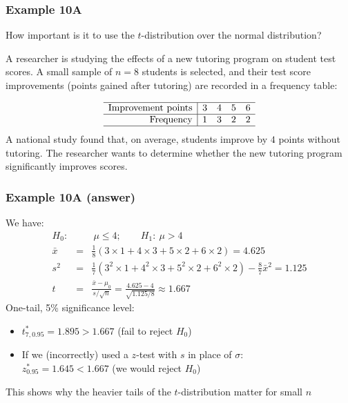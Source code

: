 \documentclass[t,8pt]{beamer}
\begin{document}
\begin{frame}
	\frametitle{Example 10A} 
	How important is it to use the $t$-distribution over the normal distribution? \par
	A researcher is studying the effects of a new tutoring program on student test scores. A small sample of \( n = 8 \) students is selected, and their test score improvements (points gained after tutoring) are recorded in a frequency table:
	
	\[
	\begin{array}{r|cccc}
		\hline
		\text{Improvement points} & 3 & 4 & 5 & 6 \\
		\hline
		\text{Frequency} & 1 & 3 & 2 & 2 \\
		\hline
	\end{array}
	\]
	A national study found that, on average, students improve by \( 4 \) points without tutoring. The researcher wants to determine whether the new tutoring program significantly improves scores.
\end{frame}

\begin{frame}
	\frametitle{Example 10A (answer)}
	We have:
	\begin{eqnarray*}
		H_0:&&\ \mu\leq 4;\qquad H_1:\ \mu>4 \\[4pt]
		\bar{x} &=& \frac 18(3 \times 1 + 4 \times 3 + 5 \times 2 + 6 \times 2)
		= 4.625 \\[4pt]
		s^2 &=& \frac 17(3^2 \times 1 + 4^2 \times 3 + 5^2 \times 2 + 6^2 \times 2)
		-\frac 8{7}\bar x^2
		= 1.125 \\[4pt]
		t &=& \frac{\bar x - \mu_0}{s / \sqrt{n}}
		= \frac{4.625 - 4}{\sqrt{1.125/8}}
		\approx 1.667
	\end{eqnarray*}
	One-tail, 5\% significance level: \par
	\begin{itemize}
		\item $t^*_{7,0.95}=1.895>1.667$ \quad (fail to reject $H_0$)
		\item If we (incorrectly) used a $z$-test with $s$ in place of $\sigma$: \\
		$z^*_{0.95}=1.645<1.667$ \quad (we would reject $H_0$)
	\end{itemize}
	{\small\color{NavyBlue} This shows why the heavier tails of the $t$-distribution matter for small $n$}
\end{frame}
\end{document}
